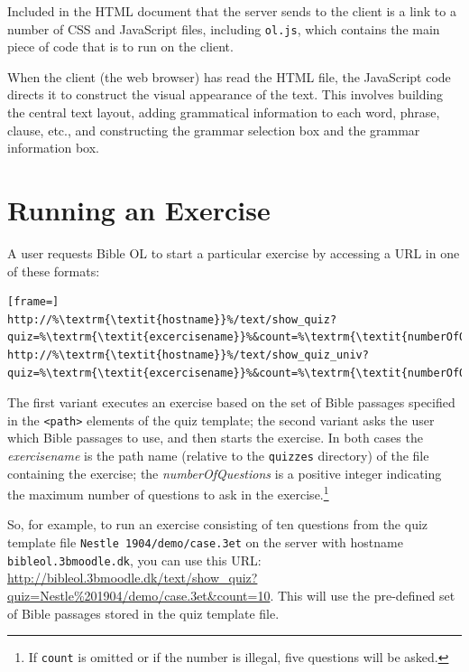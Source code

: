 \documentclass[11pt,oneside,a4paper]{memoir}
\newcommand*{\xml}[1]{\texttt{<#1>}}
\begin{document}
Included in the HTML document that the server sends to the client is a link to a number of CSS and
JavaScript files, including \texttt{ol.js}, which contains the main piece of code that is to run on
the client.

When the client (the web browser) has read the HTML file, the JavaScript code directs it to construct
the visual appearance of the text. This involves building the central text layout, adding
grammatical information to each word, phrase, clause, etc., and constructing the grammar selection
box and the grammar information box.

\section{Running an Exercise}

A user requests Bible OL to start a particular exercise by accessing a URL%
in one of these formats:

\begin{lstlisting}[frame=]
http://%\textrm{\textit{hostname}}%/text/show_quiz?quiz=%\textrm{\textit{excercisename}}%&count=%\textrm{\textit{numberOfQuestions}}%
http://%\textrm{\textit{hostname}}%/text/show_quiz_univ?quiz=%\textrm{\textit{excercisename}}%&count=%\textrm{\textit{numberOfQuestions}}%
\end{lstlisting}

The first variant executes an exercise based on the set of Bible passages specified in the
\xml{path} elements of the quiz template; the second variant asks the user
which Bible passages to use, and then starts the exercise. In both cases the \emph{exercisename} is
the path name (relative to the \texttt{quizzes} directory) of the file containing the exercise; the
\emph{numberOfQuestions} is a positive integer indicating the maximum number of questions to ask in
the exercise.\footnote{If \texttt{count} is omitted or if the number is illegal, five questions will
  be asked.}

So, for example, to run an exercise consisting of ten questions from the quiz template file
\texttt{Nestle~1904/demo/case.3et} on the server with hostname \texttt{bibleol.3bmoodle.dk}, you can
use this URL:
\url{http://bibleol.3bmoodle.dk/text/show_quiz?quiz=Nestle\%201904/demo/case.3et&count=10}. This
will use the pre-defined set of Bible passages stored in the quiz template file.
\end{document}
